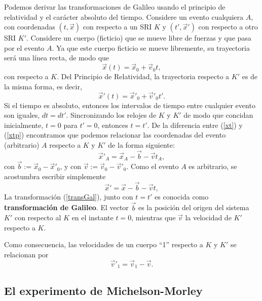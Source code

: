 Podemos derivar las transformaciones de Galileo usando el principio de
relatividad y el carácter absoluto del tiempo. Considere un evento cualquiera
$A$, con coordenadas $(t,\vec{x})$ con respecto a un SRI $K$ y
$(t',\vec{x}') $ con respecto a otro SRI $K'$. Considere un cuerpo
(ficticio) que se mueve libre de fuerzas y que pasa por el evento $A$. Ya que
este cuerpo ficticio se mueve libremente, su trayectoria será una línea recta,
de modo que
\begin{equation}
\vec{x}(t)=\vec{x}_0+\vec{v}_0 t, \label{xt}
\end{equation}
con respecto a $K$. Del Principio de Relatividad, la trayectoria respecto a $K'$
es de la misma forma, es decir,
\begin{equation}
\vec{x}'(t)=\vec{x}'_0+\vec{v}'_0 t'. \label{xtp}
\end{equation}
Si el tiempo es absoluto, entonces los intervalos de tiempo entre cualquier
evento son iguales, $dt=dt'$. Sincronizando los relojes de $K$ y $K'$ de modo
que concidan inicialmente, $t=0$ para $t'=0$, entonces $t=t'$. De la diferencia
entre (\ref{xt}) y (\ref{xtp}) encontramos que podemos relacionar las
coordenadas del evento (arbitrario) $A$ respecto a $K$ y $K'$ de la forma
siguiente:
\begin{equation}
\vec{x}'_A=\vec{x}_A-\vec{b}-\vec{v}t_A, \label{transGal0}
\end{equation}
con $\vec{b}:=\vec{x}_0-\vec{x}'_0$, y con $\vec{v}:=\vec{v}_0-\vec{v}'_0$. Como el evento $A$ es arbitrario, se acostumbra escribir simplemente
\begin{equation}
\vec{x}'=\vec{x}-\vec{b}-\vec{v}t, \label{transGal}
\end{equation}
 La transformación  (\ref{transGal}), junto con $t=t'$ es conocida como \textbf{transformación de Galileo}. El vector $\vec{b}$ es la posición del origen del sistema $K'$ con respecto al $K$ en el instante $t=0$, mientras que $\vec{v}$ la velocidad de $K'$ respecto a $K$.

Como consecuencia, las velocidades de un cuerpo ``1'' respecto a $K$ y $K'$ se relacionan por
\begin{equation}
\vec{v}'_1=\vec{v}_1-\vec{v}. \label{transGalv}
\end{equation}

\subsection{El experimento de Michelson-Morley}

